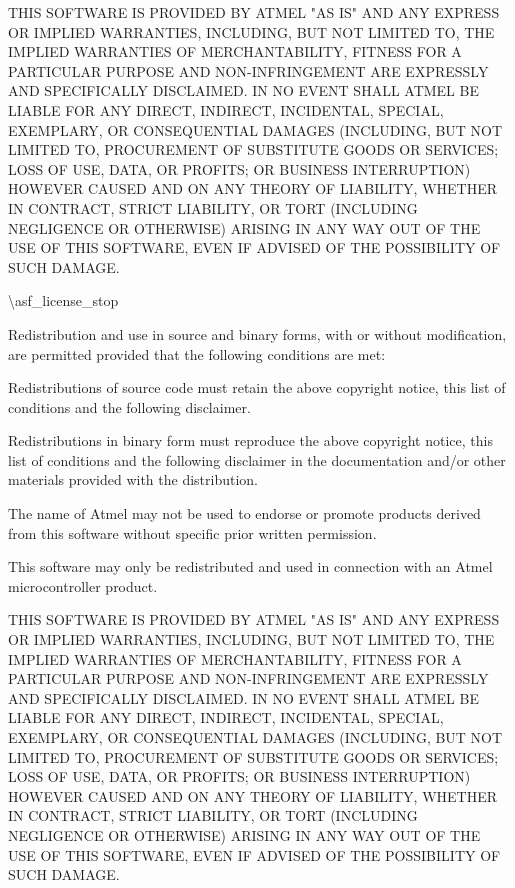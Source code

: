 THIS SOFTWARE IS PROVIDED BY ATMEL "{}\+AS IS"{} AND ANY EXPRESS OR IMPLIED WARRANTIES, INCLUDING, BUT NOT LIMITED TO, THE IMPLIED WARRANTIES OF MERCHANTABILITY, FITNESS FOR A PARTICULAR PURPOSE AND NON-\/\+INFRINGEMENT ARE EXPRESSLY AND SPECIFICALLY DISCLAIMED. IN NO EVENT SHALL ATMEL BE LIABLE FOR ANY DIRECT, INDIRECT, INCIDENTAL, SPECIAL, EXEMPLARY, OR CONSEQUENTIAL DAMAGES (INCLUDING, BUT NOT LIMITED TO, PROCUREMENT OF SUBSTITUTE GOODS OR SERVICES; LOSS OF USE, DATA, OR PROFITS; OR BUSINESS INTERRUPTION) HOWEVER CAUSED AND ON ANY THEORY OF LIABILITY, WHETHER IN CONTRACT, STRICT LIABILITY, OR TORT (INCLUDING NEGLIGENCE OR OTHERWISE) ARISING IN ANY WAY OUT OF THE USE OF THIS SOFTWARE, EVEN IF ADVISED OF THE POSSIBILITY OF SUCH DAMAGE.

\textbackslash{}asf\+\_\+license\+\_\+stop

Redistribution and use in source and binary forms, with or without modification, are permitted provided that the following conditions are met:\+


\begin{DoxyEnumerate}
\item Redistributions of source code must retain the above copyright notice, this list of conditions and the following disclaimer.
\item Redistributions in binary form must reproduce the above copyright notice, this list of conditions and the following disclaimer in the documentation and/\+or other materials provided with the distribution.
\item The name of Atmel may not be used to endorse or promote products derived from this software without specific prior written permission.
\item This software may only be redistributed and used in connection with an Atmel microcontroller product.
\end{DoxyEnumerate}

THIS SOFTWARE IS PROVIDED BY ATMEL "{}\+AS IS"{} AND ANY EXPRESS OR IMPLIED WARRANTIES, INCLUDING, BUT NOT LIMITED TO, THE IMPLIED WARRANTIES OF MERCHANTABILITY, FITNESS FOR A PARTICULAR PURPOSE AND NON-\/\+INFRINGEMENT ARE EXPRESSLY AND SPECIFICALLY DISCLAIMED. IN NO EVENT SHALL ATMEL BE LIABLE FOR ANY DIRECT, INDIRECT, INCIDENTAL, SPECIAL, EXEMPLARY, OR CONSEQUENTIAL DAMAGES (INCLUDING, BUT NOT LIMITED TO, PROCUREMENT OF SUBSTITUTE GOODS OR SERVICES; LOSS OF USE, DATA, OR PROFITS; OR BUSINESS INTERRUPTION) HOWEVER CAUSED AND ON ANY THEORY OF LIABILITY, WHETHER IN CONTRACT, STRICT LIABILITY, OR TORT (INCLUDING NEGLIGENCE OR OTHERWISE) ARISING IN ANY WAY OUT OF THE USE OF THIS SOFTWARE, EVEN IF ADVISED OF THE POSSIBILITY OF SUCH DAMAGE.


